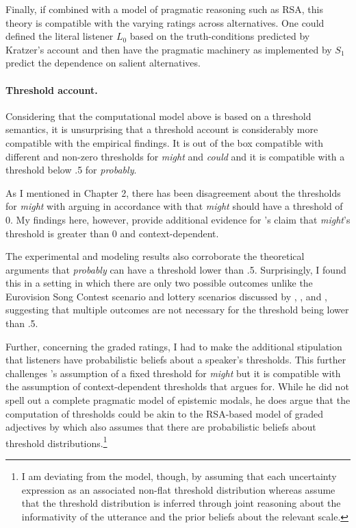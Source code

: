 Finally, if combined with a model of pragmatic reasoning such as RSA, this theory is compatible with the varying ratings across alternatives. One could defined
the literal listener $L_0$ based on the truth-conditions predicted by Kratzer's account and then have the pragmatic machinery as implemented by $S_1$ 
predict the dependence on salient alternatives. 

\paragraph{Threshold account.} Considering that the computational model above is based on a threshold semantics, 
it is unsurprising that a threshold account is considerably more compatible with the empirical findings. It is out of the box compatible
with different and non-zero thresholds for \textit{might} and \textit{could} and it is compatible with a threshold below .5 for \textit{probably}.

As I mentioned in Chapter 2, there has been disagreement about the thresholds for \textit{might} with \textcite{Yalcin2010} arguing in accordance with
\textcite{Kratzer1991} that \textit{might} should have a threshold of 0. My findings here, however, provide additional evidence for \citeauthor{Lassiter2016}'s
claim that \textit{might}'s threshold is greater than 0 and context-dependent.

The experimental and modeling results also corroborate the theoretical arguments that \textit{probably} can have a threshold lower than .5. Surprisingly,
I found this in a setting in which there are only two possible outcomes unlike the Eurovision Song Contest scenario and lottery scenarios discussed by \textcite{Lassiter2016}, \textcite{Yalcin2010}, and \textcite{Teigen1988},
suggesting that multiple outcomes are not necessary for the threshold being lower than .5.

Further, concerning the graded ratings, I had to make the additional stipulation that listeners have probabilistic beliefs about a speaker's thresholds. 
This further challenges \cite{Yalcin2010}'s assumption of a fixed threshold for \textit{might} but it is compatible with the assumption of context-dependent
thresholds that \textcite{Lassiter2016} argues for. While he did not spell out a complete pragmatic model of epistemic modals, he does argue that the computation 
of thresholds could be akin to the RSA-based model of graded adjectives by \textcite{Lassiter2017b} which also assumes that there are probabilistic beliefs about
threshold distributions.\footnote{I am deviating from the \textcite{Lassiter2017b} model, though, by assuming that each uncertainty expression  as an 
associated non-flat threshold distribution whereas \textcite{Lassiter2017b} assume that the threshold distribution is inferred through joint reasoning about the informativity of the utterance and the prior beliefs about the relevant scale.}

